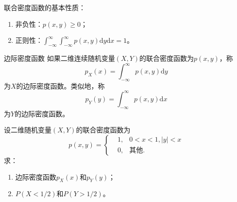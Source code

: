  \begin{property}
      联合密度函数的基本性质：
      \begin{enumerate}
          \item 非负性：$p(x,y)\geq 0$；
          \item 正则性：$\int_{-\infty}^{\infty}\int_{-\infty}^{\infty} p(x,y) \text{d}y\text{d}x = 1$。
      \end{enumerate}
  \end{property}
\begin{definition}{边际密度函数}\label{def:m.p.d.f}
    如果二维连续随机变量$(X,Y)$的联合密度函数为$p(x,y)$，称
    $$p_X(x) = \int_{-\infty}^{\infty} p(x,y) \text{d}y$$
    为$X$的边际密度函数。类似地，称
     $$p_Y(y) = \int_{-\infty}^{\infty} p(x,y) \text{d}x$$
     为$Y$的边际密度函数。
\end{definition}
\begin{example}
    设二维随机变量$(X,Y)$的联合密度函数为
    $$
    p(x,y) = \left\{
    \begin{aligned}
        &1, &0 <x<1, |y|<x\\
        &0, &\text{其他}.
    \end{aligned}
    \right.
    $$
    求：
    \begin{enumerate}
        \item 边际密度函数$p_X(x)$和$p_Y(y)$；
        \item $P(X<1/2)$和$P(Y>1/2)$。
    \end{enumerate}
\end{example}
